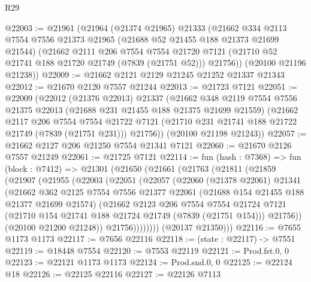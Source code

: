 \begin{lexlean}{R29}
\begin{coremodule}
@22003 := @21961
    (@21964
      (@21374 @21965)
      @21333
      (@21662
        @334
        @2113
        @7554
        @7556
        @21373
        @21965
        (@21688 @52 @21455 @188 @21373 @21699 @21544)
        (@21662
          @2111
          @206
          @7554
          @7554
          @21720
          @7121
          (@21710 @52 @21741 @188 @21720 @21749 (@7839 (@21751 @52)))
          @21756))
      (@20100 @21196 @21238))
@22009 := @21662 @2121 @2129 @21245 @21252 @21337 @21343
@22012 := @21670 @2120 @7557 @21244
@22013 := @21723 @7121
@22051 := @22009
    (@22012
      (@21376 @22013)
      @21337
      (@21662
        @348
        @2119
        @7554
        @7556
        @21375
        @22013
        (@21688 @231 @21455 @188 @21375 @21699 @21559)
        (@21662
          @2117
          @206
          @7554
          @7554
          @21722
          @7121
          (@21710 @231 @21741 @188 @21722 @21749 (@7839 (@21751 @231)))
          @21756))
      (@20100 @21198 @21243))
@22057 := @21662 @2127 @206 @21250 @7554 @21341 @7121
@22060 := @21670 @2126 @7557 @21249
@22061 := @21725 @7121
@22114 := fun (hash : @7368) =>
  fun (block : @7412) =>
  @21301
    (@21650
      (@21661
        (@21763
          (@21811
            (@21859
              (@21907
                (@21955
                  (@22003
                    (@22051
                      (@22057
                        (@22060
                          (@21378 @22061)
                          @21341
                          (@21662
                            @362
                            @2125
                            @7554
                            @7556
                            @21377
                            @22061
                            (@21688 @154 @21455 @188 @21377 @21699 @21574)
                            (@21662
                              @2123
                              @206
                              @7554
                              @7554
                              @21724
                              @7121
                              (@21710 @154 @21741 @188 @21724 @21749 (@7839 (@21751 @154)))
                              @21756))
                          (@20100 @21200 @21248))
                        @21756))))))))
        (@20137 @21350)))
@22116 := @7655 @1173 @1173
@22117 := @7656 @22116
@22118 := (state : @22117) -> @7551
@22119 := @18448 @7554
@22120 := @7553 @22119
@22121 := Prod.fst.{0, 0}
@22123 := @22121 @1173 @1173
@22124 := Prod.snd.{0, 0}
@22125 := @22124 @18
@22126 := @22125 @22116
@22127 := @22126 @7113

\end{coremodule}
\end{lexlean}
